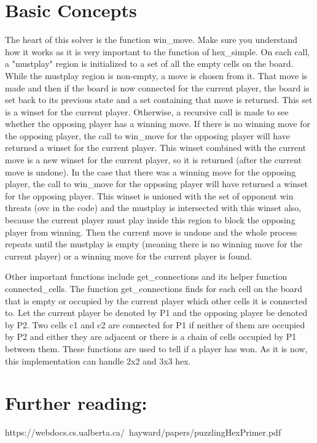 \documentclass{article}
\begin{document}
\section*{Basic Concepts}
The heart of this solver is the function win\_move. Make sure you understand how it works as it is very important to the function of hex\_simple. On each call, a "mustplay" region is initialized to a set of all the empty cells on the board. While the mustplay region is non-empty, a move is chosen from it. That move is made and then if the board is now connected for the current player, the board is set back to its previous state and a set containing that move is returned. This set is a winset for the current player. Otherwise, a recursive call is made to see whether the opposing player has a winning move. If there is no winning move for the opposing player, the call to win\_move for the opposing player will have returned a winset for the current player. This winset combined with the current move is a new winset for the current player, so it is returned (after the current move is undone). In the case that there was a winning move for the opposing player, the call to win\_move for the opposing player will have returned a winset for the opposing player. This winset is unioned with the set of opponent win threats (ovc in the code) and the mustplay is intersected with this winset also, because the current player must play inside this region to block the opposing player from winning. Then the current move is undone and the whole process repeats until the mustplay is empty (meaning there is no winning move for the current player) or a winning move for the current player is found.

Other important functions include get\_connections and its helper function connected\_cells. The function get\_connections finds for each cell on the board that is empty or occupied by the current player which other cells it is connected to. Let the current player be denoted by P1 and the opposing player be denoted by P2. Two cells c1 and c2 are connected for P1 if neither of them are occupied by P2 and either they are adjacent or there is a chain of cells occupied by P1 between them. These functions are used to tell if a player has won. As it is now, this implementation can handle 2x2 and 3x3 hex.

\section*{Further reading:}
	https://webdocs.cs.ualberta.ca/~hayward/papers/puzzlingHexPrimer.pdf
\end{document}
